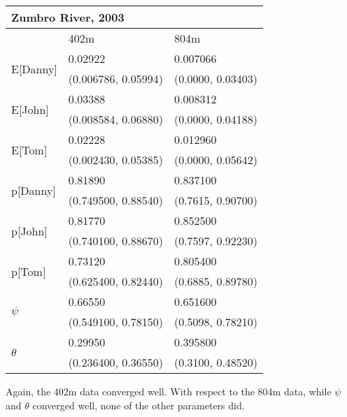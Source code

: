 \documentclass[12pt]{article}
\begin{document}
    \begin{center}
    \begin{tabular}{|l|l|l|}
        \hline
        \multicolumn{3}{|l|}{\textbf{Zumbro River, 2003}} \\
        \hline
            & 402m & 804m \\
        \hline
        \multirow{2}{*}{E[Danny]}
            & 0.02922 & 0.007066 \\
            & (0.006786, 0.05994) & (0.0000, 0.03403) \\
        \hline
        \multirow{2}{*}{E[John]}
            & 0.03388 & 0.008312 \\
            & (0.008584, 0.06880) & (0.0000, 0.04188) \\
        \hline
        \multirow{2}{*}{E[Tom]}
            & 0.02228 & 0.012960 \\
            & (0.002430, 0.05385) & (0.0000, 0.05642) \\
        \hline
        \multirow{2}{*}{p[Danny]}
            & 0.81890 & 0.837100 \\
            & (0.749500, 0.88540) & (0.7615, 0.90700) \\
        \hline
        \multirow{2}{*}{p[John]}
            & 0.81770 & 0.852500 \\
            & (0.740100, 0.88670) & (0.7597, 0.92230) \\
        \hline
        \multirow{2}{*}{p[Tom]}
            & 0.73120 & 0.805400 \\
            & (0.625400, 0.82440) & (0.6885, 0.89780) \\
        \hline
        \multirow{2}{*}{\(\psi\)}
            & 0.66550 & 0.651600 \\
            & (0.549100, 0.78150) & (0.5098, 0.78210) \\
        \hline
        \multirow{2}{*}{\(\theta\)}
            & 0.29950 & 0.395800 \\
            & (0.236400, 0.36550) & (0.3100, 0.48520) \\
        \hline
    \end{tabular}
    \end{center}

    Again, the 402m data converged well. With respect to the 804m data, while
    \(\psi\) and \(\theta\) converged well, none of the other parameters did.
\end{document}
